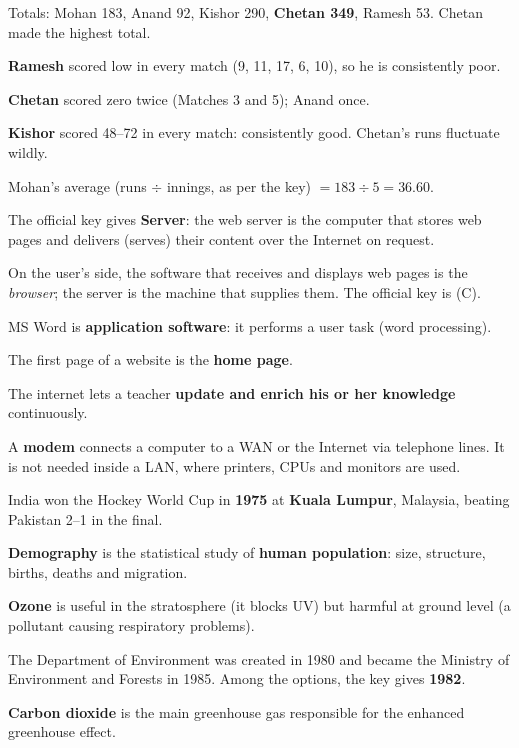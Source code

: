 Totals: Mohan 183, Anand 92, Kishor 290, \textbf{Chetan 349}, Ramesh 53. Chetan made the highest total.

\textbf{Ramesh} scored low in every match (9, 11, 17, 6, 10), so he is consistently poor.

\textbf{Chetan} scored zero twice (Matches 3 and 5); Anand once.

\textbf{Kishor} scored 48--72 in every match: consistently good. Chetan's runs fluctuate wildly.

Mohan's average (runs $\div$ innings, as per the key) $=183\div5=\mathbf{36.60}$.

The official key gives \textbf{Server}: the web server is the computer that stores web pages and delivers (serves) their content over the Internet on request.

On the user's side, the software that receives and displays web pages is the \emph{browser}; the server is the machine that supplies them. The official key is (C).

MS Word is \textbf{application software}: it performs a user task (word processing).

The first page of a website is the \textbf{home page}.

The internet lets a teacher \textbf{update and enrich his or her knowledge} continuously.

A \textbf{modem} connects a computer to a WAN or the Internet via telephone lines. It is not needed inside a LAN, where printers, CPUs and monitors are used.

India won the Hockey World Cup in \textbf{1975} at \textbf{Kuala Lumpur}, Malaysia, beating Pakistan 2--1 in the final.

\textbf{Demography} is the statistical study of \textbf{human population}: size, structure, births, deaths and migration.

\textbf{Ozone} is useful in the stratosphere (it blocks UV) but harmful at ground level (a pollutant causing respiratory problems).

The Department of Environment was created in 1980 and became the Ministry of Environment and Forests in 1985. Among the options, the key gives \textbf{1982}.

\textbf{Carbon dioxide} is the main greenhouse gas responsible for the enhanced greenhouse effect.

